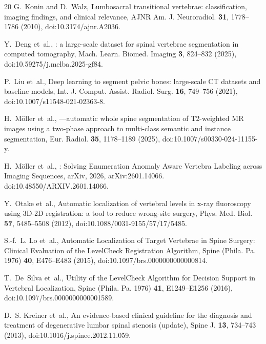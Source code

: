 \documentclass[aapm,mph,amsmath,amssymb,reprint]{revtex4-2}
\begin{document}
\begin{thebibliography}{20}
G.~Konin and D.~Walz,
\newblock Lumbosacral transitional vertebrae: classification, imaging findings, and clinical relevance,
\newblock AJNR Am. J. Neuroradiol. {\bf 31}, 1778--1786 (2010),
\newblock doi:10.3174/ajnr.A2036.

Y.~Deng et~al.,
: a large-scale dataset for spinal vertebrae segmentation in computed tomography,
\newblock Mach. Learn. Biomed. Imaging {\bf 3}, 824--832 (2025),
\newblock doi:10.59275/j.melba.2025-gf84.

P.~Liu et~al.,
\newblock Deep learning to segment pelvic bones: large-scale {CT} datasets and baseline models,
\newblock Int. J. Comput. Assist. Radiol. Surg. {\bf 16}, 749--756 (2021),
\newblock doi:10.1007/s11548-021-02363-8.

H.~M{\"o}ller et~al.,
—automatic whole spine segmentation of {T2}-weighted {MR} images using a two-phase approach to multi-class semantic and instance segmentation,
\newblock Eur. Radiol. {\bf 35}, 1178--1189 (2025),
\newblock doi:10.1007/s00330-024-11155-y.

H.~M{\"o}ller et~al.,
: Solving Enumeration Anomaly Aware Vertebra Labeling across Imaging Sequences,
\newblock arXiv, 2026,
\newblock arXiv:2601.14066. doi:10.48550/ARXIV.2601.14066.

Y.~Otake et~al.,
\newblock Automatic localization of vertebral levels in x-ray fluoroscopy using {3D-2D} registration: a tool to reduce wrong-site surgery,
\newblock Phys. Med. Biol. {\bf 57}, 5485--5508 (2012),
\newblock doi:10.1088/0031-9155/57/17/5485.

S.-f.~L. Lo et~al.,
\newblock Automatic Localization of Target Vertebrae in Spine Surgery: Clinical Evaluation of the {LevelCheck} Registration Algorithm,
\newblock Spine (Phila. Pa. 1976) {\bf 40}, E476--E483 (2015),
\newblock doi:10.1097/brs.0000000000000814.

T.~De~Silva et~al.,
\newblock Utility of the {LevelCheck} Algorithm for Decision Support in Vertebral Localization,
\newblock Spine (Phila. Pa. 1976) {\bf 41}, E1249--E1256 (2016),
\newblock doi:10.1097/brs.0000000000001589.

D.~S. Kreiner et~al.,
\newblock An evidence-based clinical guideline for the diagnosis and treatment of degenerative lumbar spinal stenosis (update),
\newblock Spine J. {\bf 13}, 734--743 (2013),
\newblock doi:10.1016/j.spinee.2012.11.059.


\end{thebibliography}
\end{document}

